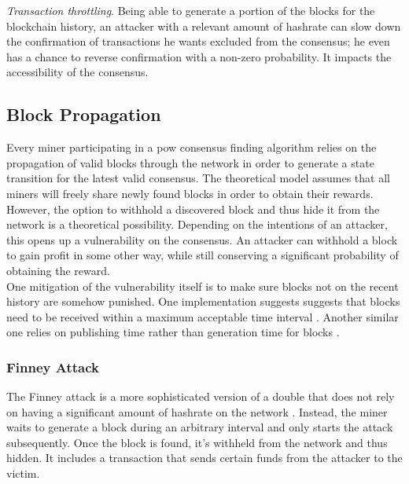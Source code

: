 \documentclass[12pt,a4paper]{article}
\begin{document}
\textit{Transaction throttling}. Being able to generate a portion of the blocks for the blockchain history, an attacker with a relevant amount of \gls{hashrate} can slow down the confirmation of \glspl{transaction} he wants excluded from the \gls{consensus}; he even has a chance to reverse confirmation with a non-zero probability. It impacts the accessibility of the \gls{consensus}.\\

\subsection{Block Propagation}

Every miner participating in a \gls{pow} consensus finding algorithm relies on the propagation of valid blocks through the network in order to generate a state transition for the latest valid \gls{consensus}. The theoretical model assumes that all miners will freely share newly found blocks in order to obtain their \glspl{reward}.\\

However, the option to withhold a discovered block and thus hide it from the network is a theoretical possibility. Depending on the intentions of an attacker, this opens up a vulnerability on the \gls{consensus}. An attacker can withhold a block to gain profit in some other way, while still conserving a significant probability of obtaining the \gls{reward}.\\

One mitigation of the vulnerability itself is to make sure blocks not on the recent history are somehow punished. One implementation suggests suggests that blocks need to be received within a maximum acceptable time interval \cite{zeroblock}. Another similar one relies on publishing time rather than generation time for blocks \cite{perish}.\\

\subsubsection{Finney Attack}

The Finney attack is a more sophisticated version of a \gls{double} that does not rely on having a significant amount of \gls{hashrate} on the network \cite{survey}. Instead, the miner waits to generate a block during an arbitrary interval and only starts the attack subsequently. Once the block is found, it's withheld from the network and thus hidden. It includes a \gls{transaction} that sends certain funds from the attacker to the victim.\\
\end{document}
